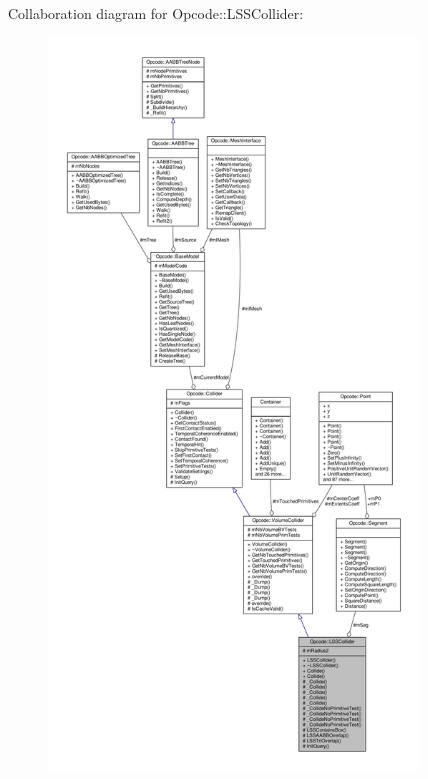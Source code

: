 Collaboration diagram for Opcode\+:\+:L\+S\+S\+Collider\+:
\nopagebreak
\begin{figure}[H]
\begin{center}
\leavevmode
\includegraphics[height=550pt]{db/d46/classOpcode_1_1LSSCollider__coll__graph}
\end{center}
\end{figure}
